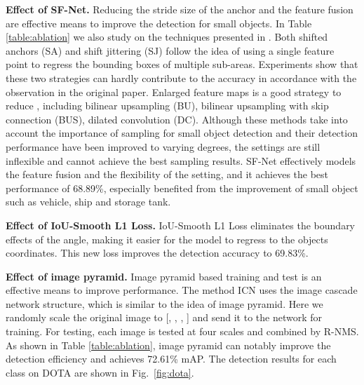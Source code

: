 \documentclass[10pt,twocolumn,letterpaper]{article}
\begin{document}
	{\bf Effect of SF-Net.} Reducing the stride size of the anchor and the feature fusion are effective means to improve the detection for small objects. In Table \ref{table:ablation} we also study on the techniques presented in \cite{zhu2018seeing}. Both shifted anchors (SA) and shift jittering (SJ) follow the idea of using a single feature point to regress the bounding boxes of multiple sub-areas. Experiments show that these two strategies can hardly contribute to the accuracy in accordance with the observation in the original paper. Enlarged feature maps is a good strategy to reduce , including bilinear upsampling (BU), bilinear upsampling with skip connection (BUS), dilated convolution (DC). Although these methods take into account the importance of sampling for small object detection and their detection performance have been improved to varying degrees, the   settings are still inflexible and cannot achieve the best sampling results. SF-Net effectively models the feature fusion and the flexibility of the  setting, and it achieves the best performance of 68.89\%, especially benefited from the improvement of small object such as vehicle, ship and storage tank.
	
	{\bf Effect of IoU-Smooth L1 Loss.} IoU-Smooth L1 Loss  eliminates the boundary effects of the angle, making it easier for the model to regress to the objects coordinates. This new loss improves the detection accuracy to 69.83\%.
	
	{\bf Effect of image pyramid.} Image pyramid based training and test is an effective means to improve performance. The method ICN \cite{azimi2018towards} uses the image cascade network structure, which is similar to the idea of image pyramid. Here we randomly scale the original image to [, , , ] and send it to the network for training. For testing, each image is tested at four scales and combined by R-NMS. As shown in Table \ref{table:ablation}, image pyramid can notably improve the detection efficiency and achieves 72.61\% mAP. The detection results for each class on DOTA are shown in Fig.~\ref{fig:dota}.
	
\end{document}

